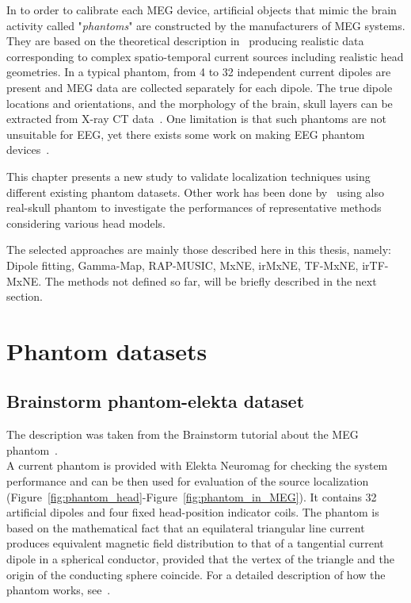 In to order to calibrate each MEG device, artificial objects that mimic the brain activity called "\textit{phantoms}" are constructed by the manufacturers of MEG systems.
They are based on the theoretical description in~\cite{ilmoniemi1985forward} producing realistic data corresponding to complex spatio-temporal current sources including realistic head geometries. In a typical phantom, from 4 to 32 independent current dipoles are present and MEG data are collected separately for each dipole. The true dipole locations and orientations, and the morphology of the brain, skull layers can be extracted from X-ray CT data~\cite{leahy1998study}. One limitation is that such phantoms are not unsuitable for EEG, yet there exists some work on making EEG phantom devices~\cite{hairston2016ballistic}.

This chapter presents a new study to validate localization techniques using different existing phantom datasets. Other work has been done by~\cite{hazim2015magnetoencephalography,leahy1998study,baillet2001evaluation} using also real-skull phantom to investigate the performances of representative methods considering various head models.

The selected approaches are mainly those described here in this thesis, namely: Dipole fitting, Gamma-Map, RAP-MUSIC, MxNE, irMxNE, TF-MxNE, irTF-MxNE. The methods not defined so far, will be briefly described in the next section.

\section{Phantom datasets}
\subsection{Brainstorm phantom-elekta dataset}
The description was taken from the Brainstorm tutorial about the MEG phantom~\cite{tadel2011brainstorm}.\\

A current phantom is provided with Elekta Neuromag for checking the system performance and can be then used for evaluation of the source localization (Figure~\ref{fig:phantom_head}-Figure~\ref{fig:phantom_in_MEG}). It contains 32 artificial dipoles and four fixed head-position indicator coils. The phantom is based on the mathematical fact that an equilateral triangular line current produces equivalent magnetic field distribution to that of a tangential current dipole in a spherical conductor, provided that the vertex of the triangle and the origin of the conducting sphere coincide. For a detailed description of how the phantom works, see~\cite{ilmoniemi1985forward}.\\
\\

